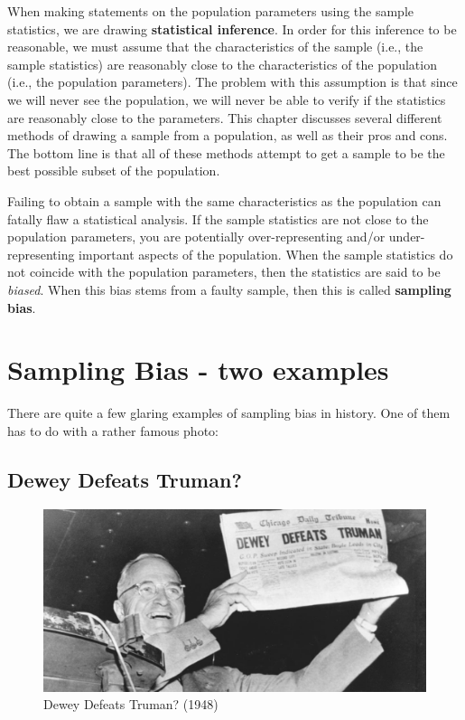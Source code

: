 \documentclass[
]{book}
\begin{document}
When making statements on the population parameters using the sample statistics, we are drawing \textbf{statistical inference}. In order for this inference to be reasonable, we must assume that the characteristics of the sample (i.e., the sample statistics) are reasonably close to the characteristics of the population (i.e., the population parameters). The problem with this assumption is that since we will never see the population, we will never be able to verify if the statistics are reasonably close to the parameters. This chapter discusses several different methods of drawing a sample from a population, as well as their pros and cons. The bottom line is that all of these methods attempt to get a sample to be the best possible subset of the population.

Failing to obtain a sample with the same characteristics as the population can fatally flaw a statistical analysis. If the sample statistics are not close to the population parameters, you are potentially over-representing and/or under-representing important aspects of the population. When the sample statistics do not coincide with the population parameters, then the statistics are said to be \emph{biased}. When this bias stems from a faulty sample, then this is called \textbf{sampling bias}.

\hypertarget{sampling-bias---two-examples}{%
\section{Sampling Bias - two examples}\label{sampling-bias---two-examples}}

There are quite a few glaring examples of sampling bias in history. One of them has to do with a rather famous photo:

\hypertarget{dewey-defeats-truman}{%
\subsection{Dewey Defeats Truman?}\label{dewey-defeats-truman}}

\begin{figure}

{\centering \includegraphics[width=0.5\linewidth]{images/timeline-truman-second-term} 

}

\caption{Dewey Defeats Truman? (1948)}\label{fig:unnamed-chunk-22}
\end{figure}
\end{document}
